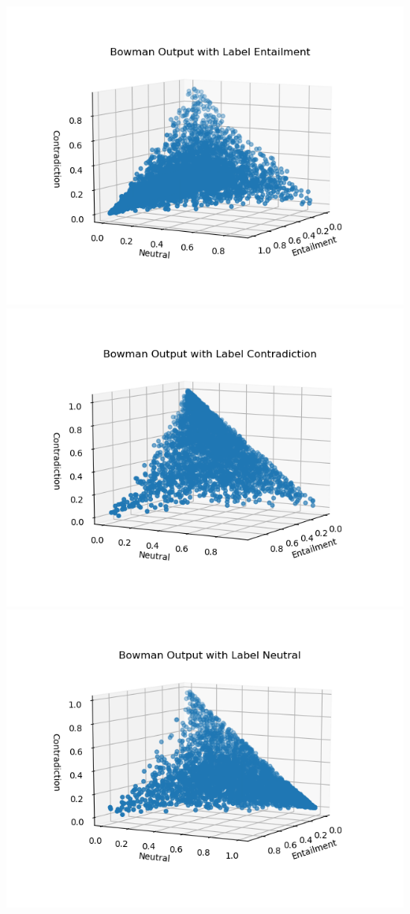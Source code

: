 \documentclass[12pt,letterpaper]{article}
\begin{document}
\begin{center}
\includegraphics[scale=0.35]{bowmanEntailment.png}
\includegraphics[scale=0.35]{bowmanContradiction.png}
\includegraphics[scale=0.35]{bowmanNeutral.png}
\end{center}
\end{document}
